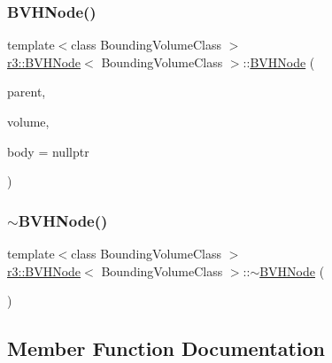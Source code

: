\subsubsection{\texorpdfstring{B\+V\+H\+Node()}{BVHNode()}\hspace{0.1cm}{\footnotesize\ttfamily [2/2]}}
{\footnotesize\ttfamily template$<$class Bounding\+Volume\+Class $>$ \\
\mbox{\hyperlink{classr3_1_1_b_v_h_node}{r3\+::\+B\+V\+H\+Node}}$<$ Bounding\+Volume\+Class $>$\+::\mbox{\hyperlink{classr3_1_1_b_v_h_node}{B\+V\+H\+Node}} (\begin{DoxyParamCaption}\item[{\mbox{\hyperlink{classr3_1_1_b_v_h_node}{B\+V\+H\+Node}}$<$ Bounding\+Volume\+Class $>$ $\ast$}]{parent,  }\item[{const Bounding\+Volume\+Class \&}]{volume,  }\item[{\mbox{\hyperlink{classr3_1_1_rigid_body}{Rigid\+Body}} $\ast$}]{body = {\ttfamily nullptr} }\end{DoxyParamCaption})}

\mbox{\label{classr3_1_1_b_v_h_node_a72194bd522058bfd362b0ab77c0303af}} 
\subsubsection{\texorpdfstring{$\sim$\+B\+V\+H\+Node()}{~BVHNode()}}
{\footnotesize\ttfamily template$<$class Bounding\+Volume\+Class $>$ \\
\mbox{\hyperlink{classr3_1_1_b_v_h_node}{r3\+::\+B\+V\+H\+Node}}$<$ Bounding\+Volume\+Class $>$\+::$\sim$\mbox{\hyperlink{classr3_1_1_b_v_h_node}{B\+V\+H\+Node}} (\begin{DoxyParamCaption}{ }\end{DoxyParamCaption})}



\subsection{Member Function Documentation}
\mbox{\label{classr3_1_1_b_v_h_node_a8c8980c3ece5abe91d2c5a01b1756a03}} 

